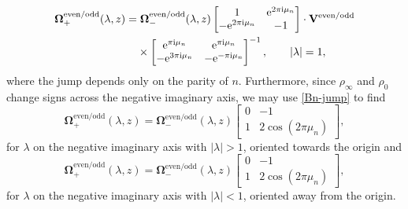 \documentclass[11pt]{article}
\numberwithin{equation}{section}
\numberwithin{equation}{section}
\newcommand{\ee}{\mathrm{e}}
\newcommand{\ii}{\mathrm{i}}
\begin{document}
\begin{align}
 &\mathbf{\Omega}^\mathrm{even/odd}_+(\lambda, z) = \mathbf{\Omega}_-^\mathrm{even/odd}(\lambda, z) \begin{bmatrix} 1 & \ee^{2\pi \ii \mu_n} \\ -\ee^{2\pi \ii \mu_n} & -1 \end{bmatrix} \cdot \mathbf{V}^\mathrm{even/odd} \nonumber\\
 &\hphantom{\mathbf{\Omega}^\mathrm{even/odd}_+(\lambda, z) =}{}
 \times\begin{bmatrix} \ee^{\pi \ii \mu_n}& \ee^{\pi \ii \mu_n}\\ - \ee^{3\pi \ii \mu_n} & - \ee^{-\pi \ii \mu_n} \end{bmatrix}^{-1}, \qquad |\lambda| = 1,
 \label{eq:Omega-jump-circle}
\end{align}
where the jump depends only on the parity of $n$. Furthermore, since $\rho_\infty$ and $\rho_0$ change signs across the negative imaginary axis, we may use \eqref{Bn-jump} to find
\begin{equation}
 \mathbf{\Omega}_+^\mathrm{even/odd} (\lambda, z) = \mathbf{\Omega}_-^\mathrm{even/odd} (\lambda, z) \begin{bmatrix}
0 & -1 \\ 1 & 2\cos(2\pi \mu_n)
\end{bmatrix},
\end{equation}
for $\lambda$ on the negative imaginary axis with $|\lambda| > 1$, oriented towards the origin and
\begin{equation}
 \mathbf{\Omega}_+^\mathrm{even/odd} (\lambda, z) = \mathbf{\Omega}_-^\mathrm{even/odd} (\lambda, z) \begin{bmatrix}
0 & -1 \\ 1 & 2\cos(2\pi \mu_n)
\end{bmatrix},
\label{eq:Omega-jump-outside-circle}
\end{equation}
for $\lambda$ on the negative imaginary axis with $|\lambda| <1$, oriented away from the origin.
\end{document}
